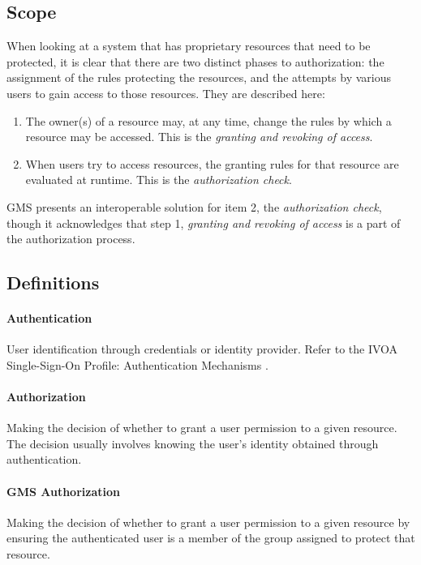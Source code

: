 \documentclass[11pt,a4paper]{ivoa}
\begin{document}
\subsection{Scope}

When looking at a system that has proprietary resources that need to be protected, it is clear that there are two distinct phases to authorization:  the assignment of the rules protecting the resources, and the attempts by various users to gain access to those resources.  They are described here:

\begin{enumerate}
\item The owner(s) of a resource may, at any time, change the rules by which a resource may be accessed. This is the \emph{granting and revoking of access}.
\item When users try to access resources, the granting rules for that resource are evaluated at runtime. This is the \emph{authorization check}.
\end{enumerate}

GMS presents an interoperable solution for item 2, the \emph{authorization check}, though it acknowledges that step 1, \emph{granting and revoking of access} is a part of the authorization process.

\subsection{Definitions}

\paragraph{Authentication} User identification through credentials or identity provider.  Refer to the IVOA Single-Sign-On Profile: Authentication Mechanisms  \citep{2017ivoa.spec.0524T}.

\paragraph{Authorization} Making the decision of whether to grant a user permission to a given resource.  The decision usually involves knowing the user's identity obtained through authentication.

\paragraph{GMS Authorization} Making the decision of whether to grant a user permission to a given resource by ensuring the authenticated user is a member of the group assigned to protect that resource.
\end{document}
